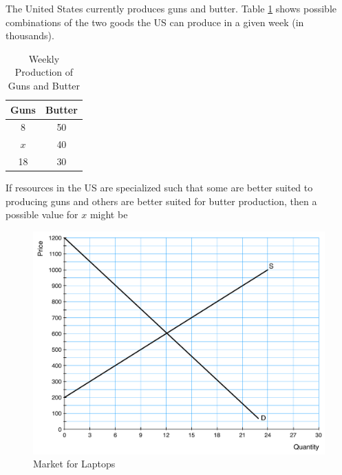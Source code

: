 \documentclass[addpoints,11pt]{exam}
\theoremstyle{definition}
\begin{document}
\begin{questions}
\question The United States currently produces guns and butter. Table \ref{MC22} shows possible combinations of the two goods the US can produce in a given week (in thousands). 

\begin{table}[h!]
	\caption{Weekly Production of Guns and Butter}
	\centering
	\begin{tabular}{  c| c} 
		
		Guns & Butter \\
		\hline
		8 & 50 \\
		$x$ & 40  \\
		18 & 30 \\
	\end{tabular}
	\label{MC22}
\end{table}

If resources in the US are specialized such that some are better suited to producing guns and others are better suited for butter production, then a possible value for $x$ might be

\begin{choices}
\end{choices}
	

		

\begin{figure}[H]
	\centering
	\includegraphics[scale=.40]{Exam1_MC16.pdf}
	\caption{Market for Laptops}
	\label{MC16}
\end{figure}


\end{questions}
\end{document}
